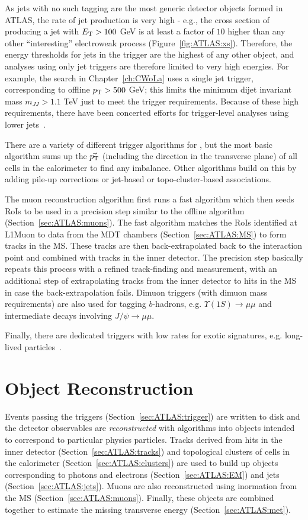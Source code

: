 As jets with no such tagging are the most generic detector objects formed in ATLAS, the rate of jet production is very high - e.g., the cross section of producing a jet with $E_{\text{T}}>100$ GeV is at least a factor of $10$ higher than any other ``interesting'' electroweak process (Figure~\ref{fig:ATLAS:xs}).
Therefore, the energy thresholds for jets in the trigger are the highest of any other object, and analyses using only jet triggers are therefore limited to very high energies.
For example, the search in Chapter~\ref{ch:CWoLa} uses a single jet trigger, corresponding to offline $p_{\text{T}}>500$ GeV; this limits the minimum dijet invariant mass $m_{JJ}>1.1$ TeV just to meet the trigger requirements.
Because of these high requirements, there have been concerted efforts for trigger-level analyses using lower \pt{} jets~\cite{Aaboud:2018fzt}.

There are a variety of different trigger algorithms for \etmiss{}, but the most basic algorithm sums up the $\vec{p_{\text{T}}}$ (including the direction in the transverse plane) of all cells in the calorimeter to find any imbalance.
Other algorithms build on this by adding pile-up corrections or jet-based or topo-cluster-based associations.

The muon reconstruction algorithm first runs a fast algorithm which then seeds RoIs to be used in a precision step similar to the offline algorithm (Section~\ref{sec:ATLAS:muons}).
The fast algorithm matches the RoIs identified at L1Muon to data from the MDT chambers (Section~\ref{sec:ATLAS:MS}) to form tracks in the MS.
These tracks are then back-extrapolated back to the interaction point and combined with tracks in the inner detector.
The precision step basically repeats this process with a refined track-finding and \pt{} measurement, with an additional step of extrapolating tracks from the inner detector to hits in the MS in case the back-extrapolation fails.
Dimuon triggers (with dimuon mass requirements) are also used for tagging $b$-hadrons, e.g. $\Upsilon(1S)\rightarrow \mu\mu$ and intermediate decays involving $J/\psi\rightarrow \mu\mu$.

Finally, there are dedicated triggers with low rates for exotic signatures, e.g. long-lived particles~\cite{Aad:2013txa}.

\section{Object Reconstruction}
\label{sec:ATLAS:objects}
Events passing the triggers (Section~\ref{sec:ATLAS:trigger}) are written to disk and the detector observables are \textit{reconstructed} with algorithms into objects intended to correspond to particular physics particles.
Tracks derived from hits in the inner detector (Section~\ref{sec:ATLAS:tracks}) and topological clusters of cells in the calorimeter (Section~\ref{sec:ATLAS:clusters}) are used to build up objects corresponding to photons and electrons (Section~\ref{sec:ATLAS:EM}) and jets (Section~\ref{sec:ATLAS:jets}).
Muons are also reconstructed using inormation from the MS (Section~\ref{sec:ATLAS:muons}).
Finally, these objects are combined together to estimate the missing transverse energy (Section~\ref{sec:ATLAS:met}).

